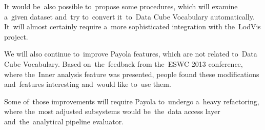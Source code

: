 It would be~also possible to~propose some procedures, which will examine a~given 
dataset and~try to~convert it~to~Data Cube Vocabulary automatically. It~will 
almost certainly require a~more sophisticated integration with the~LodVis 
project.

We will also continue to~improve Payola features, which are not related
to~Data Cube Vocabulary. Based on~the~feedback from the~ESWC 2013 conference, where the~Inner analysis feature was presented, people found these modifications and~features interesting and~would like to~use them.

Some of~those improvements will require Payola to~undergo a~heavy refactoring, 
where the~most adjusted subsystems would be~the~data access layer and~the~analytical 
pipeline evaluator.

